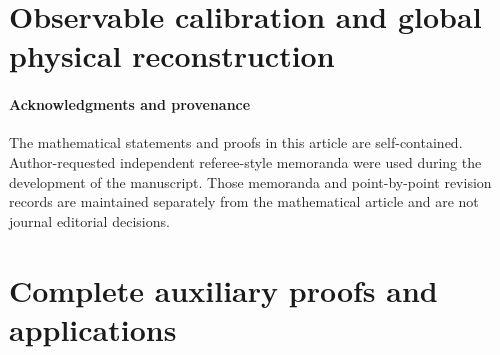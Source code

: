\part{Observable calibration and global physical reconstruction}





\subsection*{Acknowledgments and provenance}
The mathematical statements and proofs in this article are self-contained.
Author-requested independent referee-style memoranda were used during the
development of the manuscript.  Those memoranda and point-by-point revision
records are maintained separately from the mathematical article and are not
journal editorial decisions.

\appendix
\renewcommand{\thesection}{A.\arabic{section}}
\renewcommand{\theHsection}{appendix.\arabic{section}}
\part{Complete auxiliary proofs and applications}



